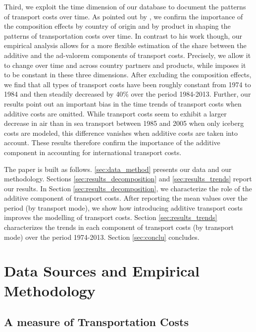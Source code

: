 \documentclass[a4paper,11pt]{article}
\begin{document}
Third, we exploit the time dimension of our database to document the patterns of transport costs over time. As pointed out by \cite{hummels2007}, we confirm the importance of the composition effects by country of origin and by product in shaping the patterns of transportation costs over time. In contrast to his work though, our empirical analysis allows for a more flexible estimation of the share between the additive and the ad-valorem components of transport costs. Precisely, we allow it to change over time and across country partners and products, while \citet{hummels2007} imposes it to be constant in these three dimensions. After excluding the composition effects, we find that all types of transport costs have been roughly constant from 1974 to 1984 and then steadily decreased by 40\% over the period 1984-2013. Further, our results point out an important bias in the time trends of transport costs when additive costs are omitted. While transport costs seem to exhibit a larger decrease in air than in sea transport between 1985 and 2005 when only iceberg costs are modeled, this difference vanishes when additive costs are taken into account. These results therefore confirm the importance of the additive component in accounting for international transport costs.\smallskip

The paper is built as follows. \ref{sec:data_method} presents our data and our  methodology. Sections \ref{sec:results_decomposition} and \ref{sec:results_trends} report our results. In Section \ref{sec:results_decomposition}, we characterize the role of the additive component of transport costs. After reporting the mean values over the period (by transport mode), we show how introducing additive transport costs improves the modelling of transport costs. Section \ref{sec:results_trends} characterizes the trends in each component of transport costs (by transport mode) over the period 1974-2013. Section \ref{sec:conclu} concludes.

\section{Data Sources and Empirical Methodology \label{sec:data_method}}

\subsection{A measure of Transportation Costs}
\end{document}

